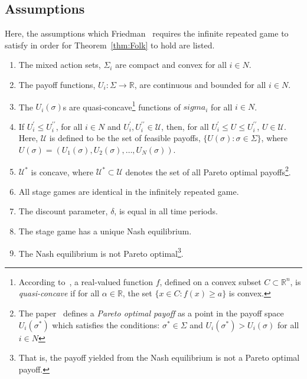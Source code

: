 \subsection{Assumptions}\label{subsec:Assumptions}
Here, the assumptions which Friedman~\cite{Friedman1971} requires the
infinite repeated game to satisfy in order for Theorem~\ref{thm:Folk} to hold are listed.
\begin{enumerate}
    \item The mixed action sets, \(\Sigma_{i}\) are compact and convex for all
    \(i\in N\). 

    \item The payoff functions, \(U_{i}: \Sigma \to \mathbb{R}\), are continuous
    and bounded for all \(i\in N\).

    \item The \(U_{i}(\sigma)\)s are quasi-concave\footnote{According
    to~\cite{Stover}, a real-valued function \(f\), defined on a convex subset
    \(C \subset \mathbb{R}^n\), is \textit{quasi-concave} if for all \(\alpha
    \in \mathbb{R}\), the set \( \{ x \in C : f(x) \ge a \} \) is convex.}
    functions of \(sigma_{i}\) for all \(i\in N\).

    \item If  \(U_{i}^{\prime} \le U_{i}^{\prime\prime}\), for all \(i\in N\)
    and \(U_{i}^{\prime}, U_{i}^{\prime\prime} \in \mathcal{U}\), then, for all
    \(U_{i}^{\prime} \le U \le U_{i}^{\prime\prime}\), \(U \in \mathcal{U}\). Here, \(\mathcal{U}\)
    is defined to be the set of feasible payoffs, \( \{ U(\sigma) : \sigma \in
    \Sigma \} \), where \(U(\sigma) = (U_{1}(\sigma), U_{2}(\sigma), \ldots,
    U_{N}(\sigma))\).

    \item \(\mathcal{U}^{*}\) is concave, where \(\mathcal{U}^{*} \subset \mathcal{U}\) denotes the
    set of all Pareto optimal payoffs\footnote{The paper~\cite{Friedman1971} defines a
    \textit{Pareto optimal payoff} as a point in the payoff space
    \(U_{i}(\sigma^{*})\) which satisfies the conditions: \(\sigma^{*} \in
    \Sigma \) and \(U_{i}(\sigma^{*}) > U_{i}(\sigma)\) for all \(i \in N\)}.

    \item All stage games are identical in the infinitely repeated game.

    \item The discount parameter, \(\delta \), is equal in all time periods.
    
    \item The stage game has a unique Nash equilibrium.

    \item The Nash equilibrium is not Pareto optimal\footnote{That is, the
    payoff yielded from the Nash equilibrium is not a Pareto optimal payoff.}. 
\end{enumerate}


